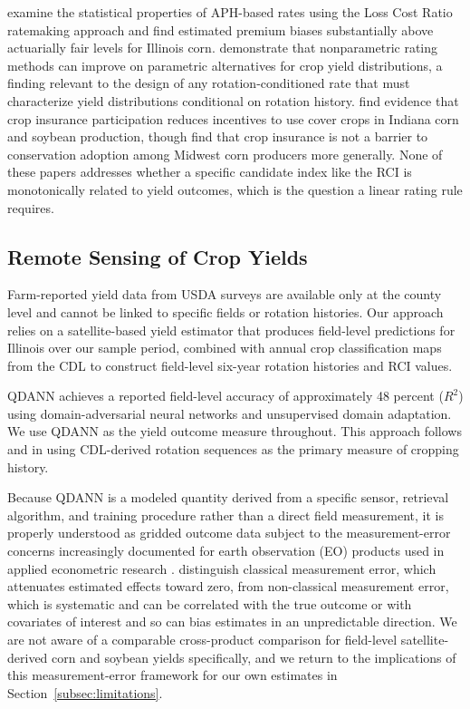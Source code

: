 \documentclass[12pt,letterpaper]{article}
\theoremstyle{remark}
\theoremstyle{remark}
\theoremstyle{plain}
\theoremstyle{definition}
\begin{document}
\cite{Woodard2011} examine the statistical properties of APH-based rates using the Loss Cost Ratio ratemaking approach and find estimated premium biases substantially above actuarially fair levels for Illinois corn. \cite{Ker2000} demonstrate that nonparametric rating methods can improve on parametric alternatives for crop yield distributions, a finding relevant to the design of any rotation-conditioned rate that must characterize yield distributions conditional on rotation history. \cite{Connor2022} find evidence that crop insurance participation reduces incentives to use cover crops in Indiana corn and soybean production, though \cite{Fleckenstein2020} find that crop insurance is not a barrier to conservation adoption among Midwest corn producers more generally. None of these papers addresses whether a specific candidate index like the RCI is monotonically related to yield outcomes, which is the question a linear rating rule requires.

\subsection{\label{subsec:remote_sensing}Remote Sensing of Crop Yields}

Farm-reported yield data from USDA surveys are available only at the county level and cannot be linked to specific fields or rotation histories. Our approach relies on a satellite-based yield estimator that produces field-level predictions for Illinois over our sample period, combined with annual crop classification maps from the CDL to construct field-level six-year rotation histories and RCI values.

QDANN \citep{Ma2024} achieves a reported field-level accuracy of approximately 48 percent ($R^2$) using domain-adversarial neural networks and unsupervised domain adaptation. We use QDANN as the yield outcome measure throughout. This approach follows \citet{Pates2025} and \citet{socolar2021} in using CDL-derived rotation sequences as the primary measure of cropping history.

Because QDANN is a modeled quantity derived from a specific sensor, retrieval algorithm, and training procedure rather than a direct field measurement, it is properly understood as gridded outcome data subject to the measurement-error concerns increasingly documented for earth observation (EO) products used in applied econometric research \citep{Benami2026}. \citet{Benami2026} distinguish classical measurement error, which attenuates estimated effects toward zero, from non-classical measurement error, which is systematic and can be correlated with the true outcome or with covariates of interest and so can bias estimates in an unpredictable direction. We are not aware of a comparable cross-product comparison for field-level satellite-derived corn and soybean yields specifically, and we return to the implications of this measurement-error framework for our own estimates in Section~\ref{subsec:limitations}.
\end{document}
